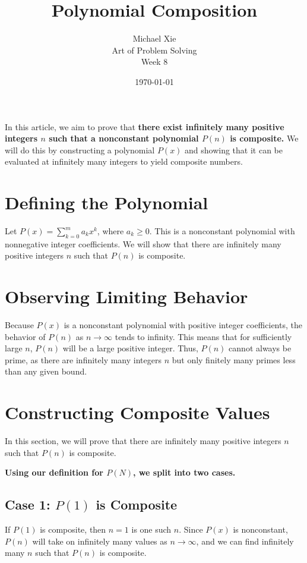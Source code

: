 \documentclass{article}
\title{Polynomial Composition}
\author{Michael Xie \\ Art of Problem Solving \\ Week 8}
\date{\today}
\begin{document}
\maketitle

In this article, we aim to prove that \textbf{there exist infinitely many positive integers $n$ such that a nonconstant polynomial $P(n)$ is composite.} We will do this by constructing a polynomial $P(x)$ and showing that it can be evaluated at infinitely many integers to yield composite numbers.

\section{Defining the Polynomial}
Let $P(x) = \sum_{k=0}^{m} a_kx^k$, where $a_k \geq 0$. This is a nonconstant polynomial with nonnegative integer coefficients. We will show that there are infinitely many positive integers $n$ such that $P(n)$ is composite.

\section{Observing Limiting Behavior}
Because $P(x)$ is a nonconstant polynomial with positive integer coefficients, the behavior of $P(n)$ as $n \to \infty$ tends to infinity. This means that for sufficiently large $n$, $P(n)$ will be a large positive integer. Thus, $P(n)$ cannot always be prime, as there are infinitely many integers $n$ but only finitely many primes less than any given bound.

\section{Constructing Composite Values}
In this section, we will prove that there are infinitely many positive integers $n$ such that $P(n)$ is composite.\\

\begin{center}
    \textbf{Using our definition for $P(N)$, we split into two cases.}
\end{center} 

\subsection{Case 1: $P(1)$ is Composite}
If $P(1)$ is composite, then $n = 1$ is one such $n$. Since $P(x)$ is nonconstant, $P(n)$ will take on infinitely many values as $n \to \infty$, and we can find infinitely many $n$ such that $P(n)$ is composite.
\end{document}
